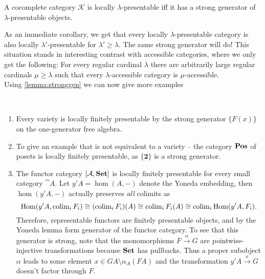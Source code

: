 \begin{Lemma}\label{lemma:stronggen}
A cocomplete category $\mathcal K$ is locally $\lambda$-presentable iff it has a strong generator of $\lambda$-presentable objects. 
\end{Lemma}

As an immediate corollary, we get that every locally $\lambda$-presentable category is also locally $\lambda'$-presentable for $\lambda' \geq \lambda$. The same strong generator will do! This situation stands in interesting contrast with accessible categories, where we only get the following: For every regular cardinal $\lambda$ there are arbitrarily large regular cardinals $\mu \geq \lambda$ such that every $\lambda$-accessible category is $\mu$-accessible. \\

Using \ref{lemma:stronggen} we can now give more examples

\begin{Example}\
\begin{enumerate}
\item Every variety is locally finitely presentable by the strong generator $\{ F(x) \}$ on the one-generator free algebra.

\item To give an example that is not equivalent to a variety -- the category $\mathbf{Pos}$ of posets is locally finitely presentable, as $\{\mathbf 2\}$ is a strong generator. %

\item The functor category $[\mathcal{A},\mathbf{Set}]$ is locally finitely presentable for every small category $\cat A$. Let $y'A = \hom(A,-)$ denote the Yoneda embedding, then $\hom(y'A,-)$ actually preserves \emph{all} colimits as 
\[ \textrm{Hom}(y'A, \operatorname{colim}_i F_i) \cong (\operatorname{colim}_i F_i)(A) \cong \operatorname{colim}_i F_i(A) \cong \operatorname{colim}_i \textrm{Hom}(y'A, F_i). \]
Therefore, representable functors are finitely presentable objects, and by the Yoneda lemma form generator of the functor category. To see that this generator is strong, note that the monomorphisms $F \xrightarrow{\alpha} G$ are pointwise-injective transformations because $\mathbf{Set}$ has pullbacks. Thus a proper subobject $\alpha$ leads to some element $x \in GA \setminus \alpha_A(FA)$ and the transformation $y'A \xrightarrow{x} G$ doesn't factor through $F$. %
\end{enumerate}
\end{Example}



